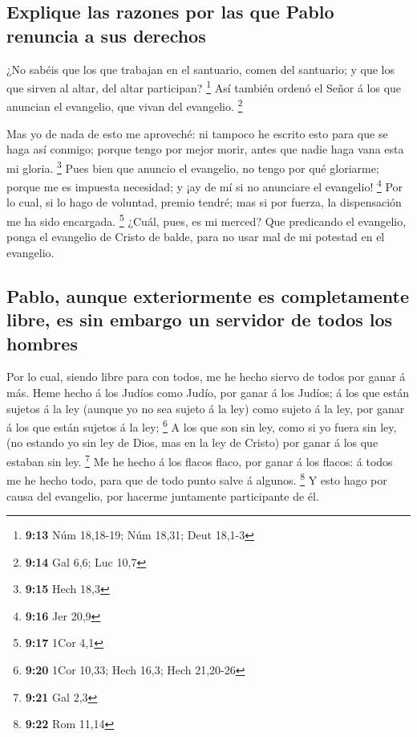 \hypertarget{explique-las-razones-por-las-que-pablo-renuncia-a-sus-derechos}{%
\subsection{Explique las razones por las que Pablo renuncia a sus
derechos}\label{explique-las-razones-por-las-que-pablo-renuncia-a-sus-derechos}}

 ¿No sabéis que los que trabajan en el santuario, comen
del santuario; y que los que sirven al altar, del altar participan?
\footnote{\textbf{9:13} Núm 18,18-19; Núm 18,31; Deut 18,1-3}
 Así también ordenó el Señor á los que anuncian el
evangelio, que vivan del evangelio. \footnote{\textbf{9:14} Gal 6,6; Luc
  10,7}

 Mas yo de nada de esto me aproveché: ni tampoco he
escrito esto para que se haga así conmigo; porque tengo por mejor morir,
antes que nadie haga vana esta mi gloria. \footnote{\textbf{9:15} Hech
  18,3}  Pues bien que anuncio el evangelio, no tengo por
qué gloriarme; porque me es impuesta necesidad; y ¡ay de mí si no
anunciare el evangelio! \footnote{\textbf{9:16} Jer 20,9}
 Por lo cual, si lo hago de voluntad, premio tendré; mas
si por fuerza, la dispensación me ha sido encargada. \footnote{\textbf{9:17}
  1Cor 4,1}  ¿Cuál, pues, es mi merced? Que predicando el
evangelio, ponga el evangelio de Cristo de balde, para no usar mal de mi
potestad en el evangelio.

\hypertarget{pablo-aunque-exteriormente-es-completamente-libre-es-sin-embargo-un-servidor-de-todos-los-hombres}{%
\subsection{Pablo, aunque exteriormente es completamente libre, es sin
embargo un servidor de todos los
hombres}\label{pablo-aunque-exteriormente-es-completamente-libre-es-sin-embargo-un-servidor-de-todos-los-hombres}}

 Por lo cual, siendo libre para con todos, me he hecho
siervo de todos por ganar á más.  Heme hecho á los Judíos
como Judío, por ganar á los Judíos; á los que están sujetos á la ley
(aunque yo no sea sujeto á la ley) como sujeto á la ley, por ganar á los
que están sujetos á la ley; \footnote{\textbf{9:20} 1Cor 10,33; Hech
  16,3; Hech 21,20-26}  A los que son sin ley, como si yo
fuera sin ley, (no estando yo sin ley de Dios, mas en la ley de Cristo)
por ganar á los que estaban sin ley. \footnote{\textbf{9:21} Gal 2,3}
 Me he hecho á los flacos flaco, por ganar á los flacos:
á todos me he hecho todo, para que de todo punto salve á algunos.
\footnote{\textbf{9:22} Rom 11,14}  Y esto hago por causa
del evangelio, por hacerme juntamente participante de él.

